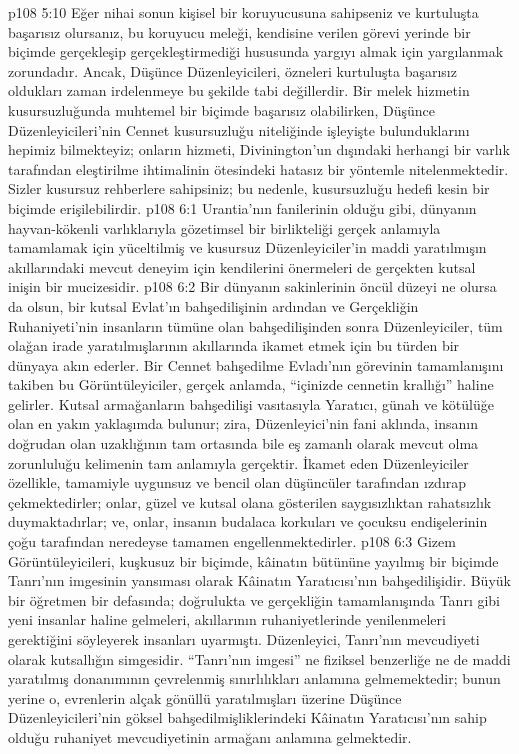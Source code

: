 \vs p108 5:10 Eğer nihai sonun kişisel bir koruyucusuna sahipseniz ve kurtuluşta başarısız olursanız, bu koruyucu meleği, kendisine verilen görevi yerinde bir biçimde gerçekleşip gerçekleştirmediği hususunda yargıyı almak için yargılanmak zorundadır. Ancak, Düşünce Düzenleyicileri, özneleri kurtuluşta başarısız oldukları zaman irdelenmeye bu şekilde tabi değillerdir. Bir melek hizmetin kusursuzluğunda muhtemel bir biçimde başarısız olabilirken, Düşünce Düzenleyicileri’nin Cennet kusursuzluğu niteliğinde işleyişte bulunduklarını hepimiz bilmekteyiz; onların hizmeti, Divinington’un dışındaki herhangi bir varlık tarafından eleştirilme ihtimalinin ötesindeki hatasız bir yöntemle nitelenmektedir. Sizler kusursuz rehberlere sahipsiniz; bu nedenle, kusursuzluğu hedefi kesin bir biçimde erişilebilirdir.
\vs p108 6:1 Urantia’nın fanilerinin olduğu gibi, dünyanın hayvan\hyp{}kökenli varlıklarıyla gözetimsel bir birlikteliği gerçek anlamıyla tamamlamak için yüceltilmiş ve kusursuz Düzenleyiciler’in maddi yaratılmışın akıllarındaki mevcut deneyim için kendilerini önermeleri de gerçekten kutsal inişin bir mucizesidir.
\vs p108 6:2 Bir dünyanın sakinlerinin öncül düzeyi ne olursa da olsun, bir kutsal Evlat’ın bahşedilişinin ardından ve Gerçekliğin Ruhaniyeti’nin insanların tümüne olan bahşedilişinden sonra Düzenleyiciler, tüm olağan irade yaratılmışlarının akıllarında ikamet etmek için bu türden bir dünyaya akın ederler. Bir Cennet bahşedilme Evladı’nın görevinin tamamlanışını takiben bu Görüntüleyiciler, gerçek anlamda, “içinizde cennetin krallığı” haline gelirler. Kutsal armağanların bahşedilişi vasıtasıyla Yaratıcı, günah ve kötülüğe olan en yakın yaklaşımda bulunur; zira, Düzenleyici’nin fani aklında, insanın doğrudan olan uzaklığının tam ortasında bile eş zamanlı olarak mevcut olma zorunluluğu kelimenin tam anlamıyla gerçektir. İkamet eden Düzenleyiciler özellikle, tamamiyle uygunsuz ve bencil olan düşüncüler tarafından ızdırap çekmektedirler; onlar, güzel ve kutsal olana gösterilen saygısızlıktan rahatsızlık duymaktadırlar; ve, onlar, insanın budalaca korkuları ve çocuksu endişelerinin çoğu tarafından neredeyse tamamen engellenmektedirler.
\vs p108 6:3 Gizem Görüntüleyicileri, kuşkusuz bir biçimde, kâinatın bütününe yayılmış bir biçimde Tanrı’nın imgesinin yansıması olarak Kâinatın Yaratıcısı’nın bahşedilişidir. Büyük bir öğretmen bir defasında; doğrulukta ve gerçekliğin tamamlanışında Tanrı gibi yeni insanlar haline gelmeleri, akıllarının ruhaniyetlerinde yenilenmeleri gerektiğini söyleyerek insanları uyarmıştı. Düzenleyici, Tanrı’nın mevcudiyeti olarak kutsallığın simgesidir. “Tanrı’nın imgesi” ne fiziksel benzerliğe ne de maddi yaratılmış donanımının çevrelenmiş sınırlılıkları anlamına gelmemektedir; bunun yerine o, evrenlerin alçak gönüllü yaratılmışları üzerine Düşünce Düzenleyicileri’nin göksel bahşedilmişliklerindeki Kâinatın Yaratıcısı’nın sahip olduğu ruhaniyet mevcudiyetinin armağanı anlamına gelmektedir.
